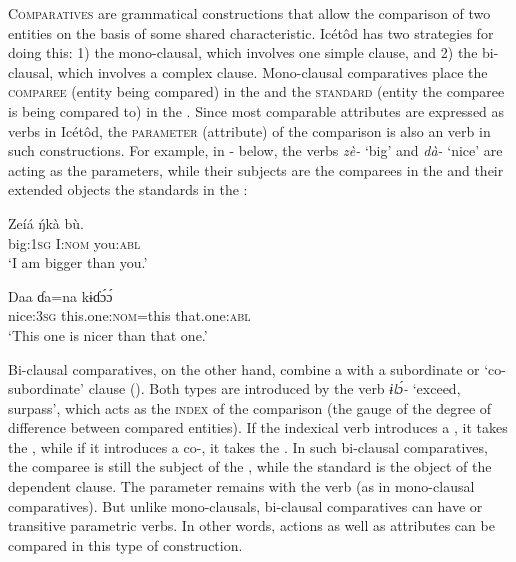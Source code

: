 \textsc{Comparatives} are grammatical constructions that allow the comparison of two entities on the basis of some shared characteristic. Icétôd has two strategies for doing this: 1) the mono-clausal, which involves one simple clause, and 2) the bi-clausal, which involves a complex clause. Mono-clausal comparatives place the \textsc{comparee} (entity being compared) in the  and the \textsc{standard} (entity the comparee is being compared to) in the . Since most comparable attributes are expressed as  verbs in Icétôd, the \textsc{parameter} (attribute) of the comparison is also an  verb in such constructions. For example, in - below, the  verbs \textit{zè-} ‘big’ and \textit{dà-} ‘nice’ are acting as the parameters, while their subjects are the comparees in the  and their extended objects the standards in the :




\ea\label{ex:syn:57}
\gll Zeíá     \'{ŋ}kà     bù. \\
big:\textsc{1sg}   I:\textsc{nom}   you:\textsc{abl}    \\
\glt ‘I am bigger than you.’ 
\z




\ea\label{ex:syn:58}
\gll Daa     ɗa=na       kɨɗ\'{ɔ}\'{ɔ} \\
nice:\textsc{3sg}   this.one:\textsc{nom}=this   that.one:\textsc{abl}    \\
\glt ‘This one is nicer than that one.’ 
\z


Bi-clausal comparatives, on the other hand, combine a  with a subordinate or ‘co-subordinate’ clause (). Both types are introduced by the verb \textit{ɨl\'{ɔ}-} ‘exceed, surpass’, which acts as the \textsc{index} of the comparison (the gauge of the degree of difference between compared entities). If the indexical verb introduces a , it takes the , while if it introduces a co-, it takes the . In such bi-clausal comparatives, the comparee is still the subject of the , while the standard is the object of the dependent clause. The parameter remains with the  verb (as in mono-clausal comparatives). But unlike mono-clausals, bi-clausal comparatives can have  or transitive parametric verbs. In other words, actions as well as attributes can be compared in this type of construction.

